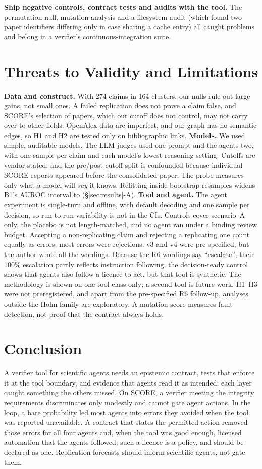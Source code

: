 \documentclass[conference]{IEEEtran}
\begin{document}
\textbf{Ship negative controls, contract tests and audits with the tool.} The permutation null, mutation analysis and a filesystem audit (which found two paper identifiers differing only in case sharing a cache entry) all caught problems and belong in a verifier's continuous-integration suite.

\section{Threats to Validity and Limitations}\label{sec:limits}
\textbf{Data and construct.} With 274 claims in 164 clusters, our nulls rule out large gains, not small ones. A failed replication does not prove a claim false, and SCORE's selection of papers, which our cutoff does not control, may not carry over to other fields. OpenAlex data are imperfect, and our graph has no semantic edges, so H1 and H2 are tested only on bibliographic links.
\textbf{Models.} We used simple, auditable models. The LLM judges used one prompt and the agents two, with one sample per claim and each model's lowest reasoning setting. Cutoffs are vendor-stated, and the pre/post-cutoff split is confounded because individual SCORE reports appeared before the consolidated paper. The probe measures only what a model will \emph{say} it knows. Refitting inside bootstrap resamples widens B1's AUROC interval to \rfBoneCi{} (\S\ref{sec:results}-A).
\textbf{Tool and agent.} The agent experiment is single-turn and offline, with default decoding and one sample per decision, so run-to-run variability is not in the CIs. Controls cover scenario~A only, the placebo is not length-matched, and no agent ran under a binding review budget. Accepting a non-replicating claim and rejecting a replicating one count equally as errors; most errors were rejections. v3 and v4 were pre-specified, but the author wrote all the wordings. Because the R6 wordings say ``escalate'', their 100\% escalation partly reflects instruction following; the decision-ready control shows that agents also follow a licence to act, but that tool is synthetic. The methodology is shown on one tool class only; a second tool is future work. H1--H3 were not preregistered, and apart from the pre-specified R6 follow-up, analyses outside the Holm family are exploratory. A mutation score measures fault detection, not proof that the contract always holds.

\section{Conclusion}
A verifier tool for scientific agents needs an epistemic contract, tests that enforce it at the tool boundary, and evidence that agents read it as intended; each layer caught something the others missed. On SCORE, a verifier meeting the integrity requirements discriminates only modestly and cannot gate agent actions. In the loop, a bare probability led most agents into errors they avoided when the tool was reported unavailable. A contract that states the permitted action removed those errors for all four agents and, when the tool was good enough, licensed automation that the agents followed; such a licence is a policy, and should be declared as one. Replication forecasts should inform scientific agents, not gate them.
\end{document}
